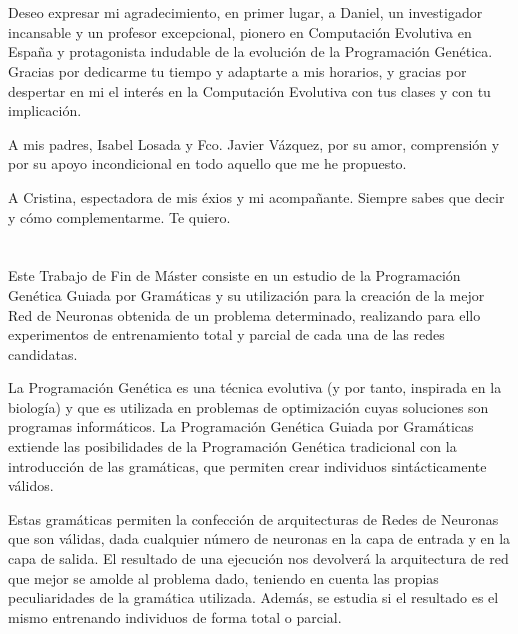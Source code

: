 \documentclass[spanish,a4paper,12pt,twoside]{report}
\begin{document}
  \chapter{\vspace{-3cm}{\LARGE Agradecimientos}}
  \vspace{-1cm}
    Deseo expresar mi agradecimiento, en primer lugar, a Daniel, un investigador incansable y un profesor excepcional, pionero en Computación Evolutiva en España y protagonista indudable de la evolución de la Programación Genética. Gracias por dedicarme tu tiempo y adaptarte a mis horarios, y gracias por despertar en mi el interés en la Computación Evolutiva con tus clases y con tu implicación.\par
    A mis padres, Isabel Losada y Fco. Javier Vázquez, por su amor, comprensión y por su apoyo incondicional en todo aquello que me he propuesto.\par
    A Cristina, espectadora de mis éxios y mi acompañante. Siempre sabes que decir y cómo complementarme. Te quiero.
  \vfill
  \newpage\cleardoublepage
  
  \chapter{\vspace{-3cm}{\LARGE Resumen}}
  \vspace{-1cm}
  Este Trabajo de Fin de Máster consiste en un estudio de la Programación Genética Guiada por Gramáticas y su utilización para la creación de la mejor Red de Neuronas obtenida de un problema determinado, realizando para ello experimentos de entrenamiento total y parcial de cada una de las redes candidatas. \par
  La Programación Genética es una técnica evolutiva (y por tanto, inspirada en la biología) y que es utilizada en problemas de optimización cuyas soluciones son programas informáticos. La Programación Genética Guiada por Gramáticas extiende las posibilidades de la Programación Genética tradicional con la introducción de las gramáticas, que permiten crear individuos sintácticamente válidos. \par
  Estas gramáticas permiten la confección de arquitecturas de Redes de Neuronas que son válidas, dada cualquier número de neuronas en la capa de entrada y en la capa de salida. El resultado de una ejecución nos devolverá la arquitectura de red que mejor se amolde al problema dado, teniendo en cuenta las propias peculiaridades de la gramática utilizada. Además, se estudia si el resultado es el mismo entrenando individuos de forma total o parcial.
  \vfill
  \newpage\cleardoublepage
  
\end{document}
